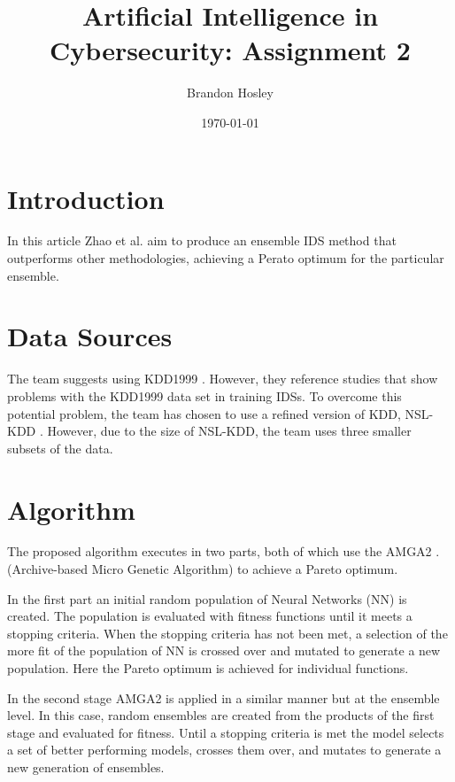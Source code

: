 \documentclass[]{article}
\title{Artificial Intelligence in Cybersecurity: Assignment 2}
\author{Brandon Hosley}
\date{\today}
\begin{document}
	\maketitle
	
\section{Introduction}

In this article \cite{Zhao2020} Zhao et al. aim to produce an ensemble IDS method that outperforms other methodologies, achieving a Perato optimum for the particular ensemble.

\section{Data Sources}

The team suggests using KDD1999 \cite{Kdd1999}. However, they reference studies
\cite{Brown2009, Mchugh2000, Engen2010}
that show problems with the KDD1999 data set in training IDSs.
To overcome this potential problem, the team has chosen to use a refined version of KDD, NSL-KDD \cite{Tavallaee2011}.
However, due to the size of NSL-KDD, the team uses three smaller subsets of the data.

\section{Algorithm}

The proposed algorithm executes in two parts, both of which use the AMGA2 \cite{Tiwari2011}. (Archive-based Micro Genetic Algorithm) to achieve a Pareto optimum.

In the first part an initial random population of Neural Networks (NN) is created.
The population is evaluated with fitness functions until it meets a stopping criteria.
When the stopping criteria has not been met, a selection of the more fit of the population of NN is crossed over and mutated to generate a new population.
Here the Pareto optimum is achieved for individual functions. 

In the second stage AMGA2 is applied in a similar manner but at the ensemble level.
In this case, random ensembles are created from the products of the first stage and evaluated for fitness.
Until a stopping criteria is met the model selects a set of better performing models, crosses them over, and mutates to generate a new generation of ensembles.
\end{document}
